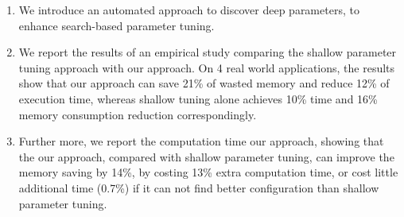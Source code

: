 \begin{enumerate}

\item We introduce an automated approach to discover deep parameters, to enhance search-based parameter tuning.

\item We report the results of an empirical study comparing the shallow parameter tuning approach with our approach. On 4 real world applications, the results show that our approach can save 21\% of wasted memory and reduce 12\% of execution time, whereas shallow tuning alone achieves 10\% time and 16\% memory consumption reduction correspondingly. 

\item Further more, we report the computation time our approach, showing that the our approach, compared with shallow parameter tuning, can improve the memory saving by 14\%, by costing 13\% extra computation time, or cost little additional time (0.7\%) if it can not find better configuration than shallow parameter tuning.

\end{enumerate}



